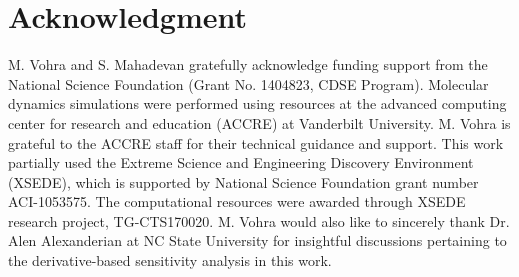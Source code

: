 \section*{Acknowledgment}
\label{sec:ack}

M. Vohra and S. Mahadevan gratefully acknowledge funding support from the
National Science Foundation (Grant No. 1404823, CDSE Program). Molecular
dynamics simulations were performed using resources at the advanced computing
center for research and education (ACCRE) at Vanderbilt University. 
M. Vohra is grateful to the ACCRE staff for their technical guidance and support.
This work partially used the Extreme Science and Engineering Discovery Environment 
(XSEDE), which is supported by National Science Foundation grant number ACI-1053575.
The computational resources were awarded through XSEDE research project, TG-CTS170020.
M. Vohra would also like to sincerely thank Dr. Alen Alexanderian at NC State 
University for insightful discussions pertaining to the derivative-based sensitivity analysis
in this work.  


